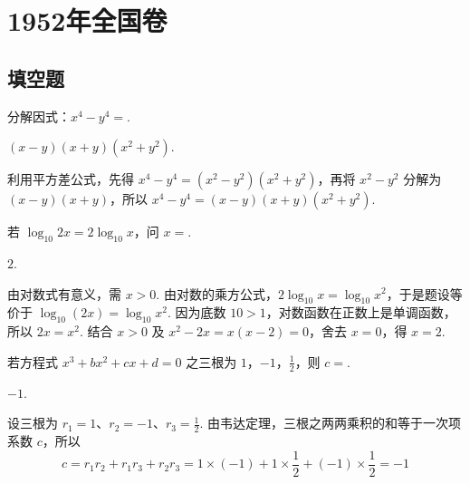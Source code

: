 \chapter{1952年全国卷}

\section{填空题}


\begin{problem}
分解因式：\(x^{4} - y^{4} =\)\fillinblank{}.
\end{problem}

\begin{answer}
\(\left( x-y \right)\left( x+y \right)\left( x^{2}+y^{2} \right)\).
\end{answer}

\begin{solution}
利用平方差公式，先得 \(x^{4}-y^{4}=\left( x^{2}-y^{2} \right)\left( x^{2}+y^{2} \right)\)，再将 \(x^{2}-y^{2}\) 分解为 \(\left( x-y \right)\left( x+y \right)\)，所以 \(x^{4}-y^{4}=\left( x-y \right)\left( x+y \right)\left( x^{2}+y^{2} \right)\).
\end{solution}

\begin{problem}
若 \(\log_{10} 2x = 2\log_{10} x\)，问 \(x=\)\fillinblank{}.
\end{problem}

\begin{answer}
\(2\).
\end{answer}

\begin{solution}
由对数式有意义，需 \(x>0\). 由对数的乘方公式，\(2\log_{10}x=\log_{10}x^{2}\)，于是题设等价于 \(\log_{10}(2x)=\log_{10}x^{2}\). 因为底数 \(10>1\)，对数函数在正数上是单调函数，所以 \(2x=x^{2}\). 结合 \(x>0\) 及 \(x^{2}-2x=x(x-2)=0\)，舍去 \(x=0\)，得 \(x=2\).
\end{solution}

\begin{problem}
若方程式 \(x^{3} + bx^{2} + cx + d = 0\) 之三根为 \(1\)，\(-1\)，\(\frac{1}{2}\)，则 \(c=\)\fillinblank{}.
\end{problem}

\begin{answer}
\(-1\).
\end{answer}

\begin{solution}
设三根为 \(r_{1}=1\)、\(r_{2}=-1\)、\(r_{3}=\frac12\). 由韦达定理，三根之两两乘积的和等于一次项系数 \(c\)，所以
\[
c=r_{1}r_{2}+r_{1}r_{3}+r_{2}r_{3}=1\times(-1)+1\times\frac12+(-1)\times\frac12=-1
\]
\end{solution}

